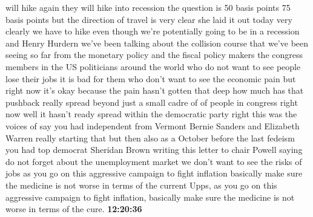 \documentclass{article}%
\begin{document}
will hike again they will hike into recession the question is 50 basis points 75 basis points but the direction of travel is very clear she laid it out today very clearly we have to hike even though we're potentially going to be in a recession and Henry Hurdern we've been talking about the collision course that we've been seeing so far from the monetary policy and the fiscal policy makers the congress members in the US politicians around the world who do not want to see people lose their jobs it is bad for them who don't want to see the economic pain but right now it's okay because the pain hasn't gotten that deep how much has that pushback really spread beyond just a small cadre of of people in congress right now well it hasn't ready spread within the democratic party right this was the voices of say you had independent from Vermont Bernie Sanders and Elizabeth Warren really starting that but then also as a October before the last fedeism you had top democrat Sheridan Brown writing this letter to chair Powell saying do not forget about the unemployment market we don't want to see the risks of jobs as you go on this aggressive campaign to fight inflation basically make sure the medicine is not worse in terms of the current  Upps, as you go on this aggressive campaign to fight inflation, basically make sure the medicine is not worse in terms of the cure.%
\textbf{12:20:36}%
\newline%
\end{document}
